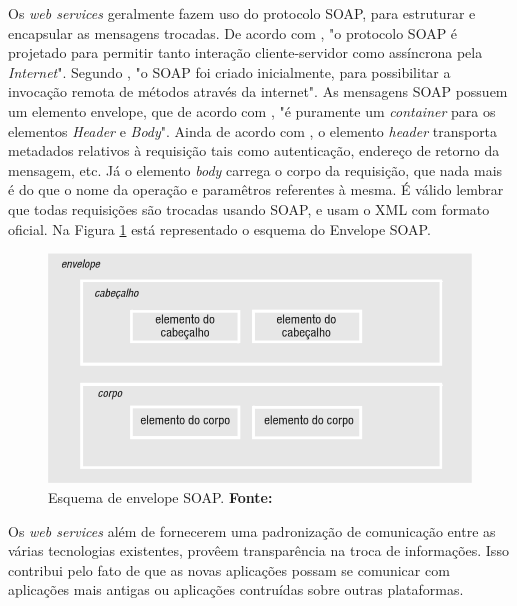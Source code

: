 	\par Os \textit{web services} geralmente fazem uso do protocolo SOAP, para
estruturar e encapsular as mensagens trocadas. De acordo com
, "o protocolo SOAP é projetado para permitir
tanto interação cliente-servidor como assíncrona pela \textit{Internet}".
Segundo , "o SOAP foi criado inicialmente, para
possibilitar a invocação remota de métodos através da internet". As mensagens
SOAP possuem um elemento envelope, que de acordo com
, "é puramente um \textit{container} para os
elementos \textit{Header} e \textit{Body}". Ainda de acordo com
, o elemento \textit{header} transporta metadados
relativos à requisição tais como autenticação, endereço de retorno da mensagem,
etc. Já o elemento \textit{body} carrega o corpo da requisição, que nada mais é
do que o nome da operação e paramêtros referentes à mesma. É válido lembrar que
todas requisições são trocadas usando SOAP, e usam o XML com formato oficial.
Na Figura \ref{fig:qt3} está representado o esquema do Envelope SOAP.
	
\begin{figure}[h!]
	\centerline{\includegraphics[scale=0.6]{./imagens/1_q_teorico/qt3.png}}
	\caption[Esquema de envelope SOAP. ]{Esquema de envelope SOAP. 
	 \textbf{Fonte:}}
	\label{fig:qt3}
\end{figure}

	\par Os \textit{web services} além de fornecerem uma padronização de
comunicação entre as várias tecnologias existentes, provêem transparência na
troca de informações. Isso contribui pelo fato de que as novas aplicações
possam se comunicar com aplicações mais antigas ou aplicações contruídas sobre
outras plataformas.

